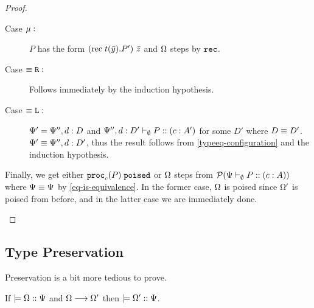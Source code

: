 \begin{proof}
\begin{itemize}
\begin{description}
      \item[Case $\mu :$] $P$ has the form ${(\mathrm{rec}\; {t}(\bar{y}) . {P}')}~{\bar{z}}$ and $\Omega$ steps by $\texttt{rec}$.

      \item[Case $\equiv\texttt{R} :$] Follows immediately by the induction hypothesis.
      \item[Case $\equiv\texttt{L} :$] $\Psi' = \Psi'', d : D$ and ${\Psi'', d : D'} \vdash_{\emptyset} P :: (c : A')$ for some $D'$ where $D \equiv D'$. $\Psi' \equiv \Psi'', d : D'$, thus the result follows from \cref{typeeq-configuration} and the induction hypothesis.
    \end{description}

    Finally, we get either $\mathtt{proc}_{c}(P)\;\mathtt{poised}$ or $\Omega$ steps from $\pred{\typeRecD \ctx \emptyset P c A}$ where $\Psi \equiv \Psi$ by \cref{eq-is-equivalence}. In the former case, $\Omega$ is poised since $\Omega'$ is poised from before, and in the latter case we are immediately done.
\end{itemize}
\end{proof}

\subsection{Type Preservation}

Preservation is a bit more tedious to prove.

\begin{theorem}[Preservation]
If $\models {\Omega} :: {\Psi}$ and $\Omega \longrightarrow \Omega'$ then $\models {\Omega'} :: {\Psi}$.
\end{theorem}

